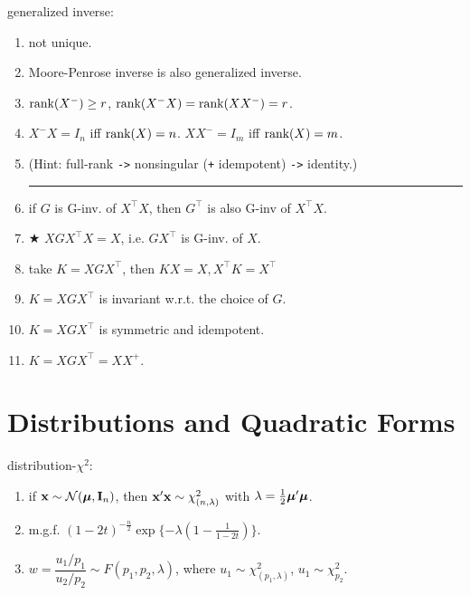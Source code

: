 generalized inverse: \begin{enumerate}
    \item not unique.
    \item Moore-Penrose inverse is also generalized inverse.
    \item $\text{rank}(X^-) \geq r$, $\text{rank}(X^- X) = \text{rank}(X X^-) = r$. 
    \item $X^-X = I_n$ iff $\text{rank}(X) = n$. $XX^- = I_m$ iff $\text{rank}(X) = m$. 
    \item [] (Hint: full-rank \verb|->| nonsingular (\verb|+| idempotent) \verb|->| identity.)

    \vspace{.5ex}\hrule\vspace{-.5ex}
    \item if $G$ is G-inv. of $X^\top X$, then $G^\top$ is also G-inv of $X^\top X$.
    \item $\bigstar$ $X G X^\top X = X$, i.e. $G X^\top$ is G-inv. of $X$.
    \item[] take $K = X G X^\top$, then $K X = X, X^\top K = X^\top$
    \item $K = X G X^\top$ is invariant w.r.t. the choice of $G$.
    \item $K = X G X^\top$ is symmetric and idempotent.
    \item $K = X G X^\top = X X^+$.
\end{enumerate}

\newcol

\section*{Distributions and Quadratic Forms}

distribution-$\chi^2$: \begin{enumerate}
    \item if $\mathbf{x} \sim \mathcal{N}(\boldsymbol{\mu}, \mathbf{I}_{n})$, then $\mathbf{x}' \mathbf{x} \sim \chi^2_{(n, \lambda)}$ with $\lambda = \frac{1}{2}\boldsymbol{\mu}'\boldsymbol{\mu}$.
    \item m.g.f. $(1-2t)^{-\frac{n}{2}}\exp\{-\lambda(1-\frac{1}{1-2t})\}$.
    \item $w = \dfrac{u_1 / p_1}{u_2 / p_2} \sim F(p_1, p_2, \lambda)$, where $u_1 \sim \chi^2_{(p_1, \lambda)}$, $u_1 \sim \chi^2_{p_2}$.
\end{enumerate}

